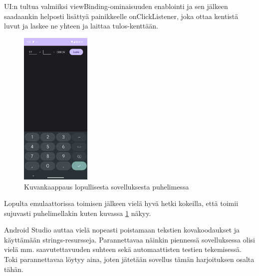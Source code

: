 UI:n tultua valmiiksi viewBinding-ominaisuuden enablointi ja sen jälkeen
saadaankin helposti lisättyä painikkeelle onClickListener, joka ottaa kentistä
luvut ja laskee ne yhteen ja laittaa tulos-kenttään.

\begin{figure}
    \includegraphics[width=0.3\textwidth]{figures/exercise-4-final.png}
    \caption{Kuvankaappaus lopullisesta sovelluksesta puhelimessa}
    \label{fig:exercise-4-final}
\end{figure}

Lopulta emulaattorissa toimisen jälkeen vielä hyvä hetki kokeilla, että toimii
sujuvasti puhelimellakin kuten kuvassa \ref{fig:exercise-4-final} näkyy.

Android Studio auttaa vielä nopeasti poistamaan tekstien kovakoodaukset ja
käyttämään strings-resursseja. Parannettavaa näinkin piennessä sovelluksessa
olisi vielä mm. saavutettavuuden suhteen sekä automaattisten testien
tekemisessä. Toki parannettavaa löytyy aina, joten jätetään sovellus tämän
harjoituksen osalta tähän.


